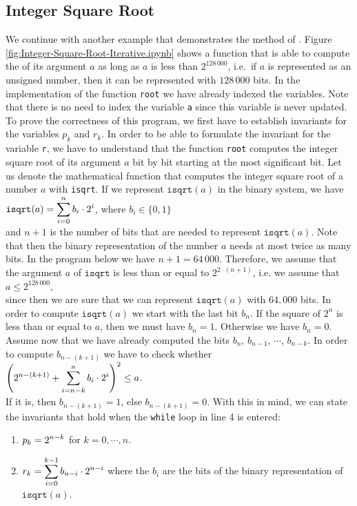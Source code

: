 \subsection{Integer Square Root}
We continue with another example that demonstrates the method of .
Figure \ref{fig:Integer-Square-Root-Iterative.ipynb} shows a function that is able to compute the
 of its argument $a$ as long as $a$ is less than $2^{128\,000}$, i.e.~if $a$ is represented as an unsigned
number, then it can be represented with $128\,000$ bits.  In the implementation of the function \texttt{root} we have
already indexed the variables.  Note that there is no 
need to index the variable \texttt{a} since this variable is never updated.  To prove the correctness of this
program, we first 
have to establish invariants for the variables $p_k$ and $r_k$.  In order to be able to formulate the invariant
for the variable \texttt{r}, we have to understand that the function \texttt{root} computes the integer square
root of its argument $a$ bit by bit starting at the most significant bit.  Let us denote the
mathematical function that computes the integer square root of a number $a$ with \texttt{isqrt}.  If we
represent $\texttt{isqrt}(a)$ in the binary system, we have
\\[0.2cm]
\hspace*{1.3cm}
$\displaystyle \mathtt{isqrt}(a) = \sum\limits_{i=0}^{n} b_i \cdot 2^i$, \quad where $b_i \in \{0,1\}$
\\[0.2cm]
and $n+1$ is the number of bits that are needed to represent $\mathtt{isqrt}(a)$.  Note that then the binary
representation of the number $a$ needs at most twice as many bits.  In the program below we have $n+1 = 64\,000$.
Therefore, we assume that the argument $a$ of $\mathtt{isqrt}$ is less than or equal to $2^{2\cdot (n+1)}$,
i.e. we assume that
\\[0.2cm]
\hspace*{1.3cm}
$a \leq 2^{128\,000}$,
\\[0.2cm]
since then we are sure that we can represent $\mathtt{isqrt}(a)$ with $64,000$ bits.
In order to compute $\mathtt{isqrt}(a)$ we start with the last bit $b_{n}$.  If the square of $2^{n}$ is
less than or equal to $a$, then we must have $b_{n} = 1$.  Otherwise we have $b_{n} = 0$.  Assume now that
we have already computed the bits $b_{n}$, $b_{n-1}$, $\cdots$, $b_{n-k}$.  In order to compute $b_{n-(k+1)}$
we have to check whether 
\\[0.2cm]
\hspace*{1.3cm}
$\displaystyle\left(\displaystyle 2^{n-(k+1)} + \sum\limits_{i=n-k}^{n} b_i \cdot 2^i \right)^2 \leq a$.
\\[0.2cm]
If it is, then  $b_{n-(k+1)} = 1$, else $b_{n-(k+1)} = 0$.
With this in mind, we can state the invariants that hold when the \texttt{while} loop in line 4 is entered:
\begin{enumerate}
\item $\displaystyle p_k = 2^{n - k}$ \quad for $k=0,\cdots,n$.
\item $\displaystyle r_k = \sum\limits_{i=0}^{k-1} b_{n-i} \cdot 2^{n-i}$ \quad where the $b_i$ are the bits of the
       binary representation of $\mathtt{isqrt}(a)$.
\end{enumerate}

